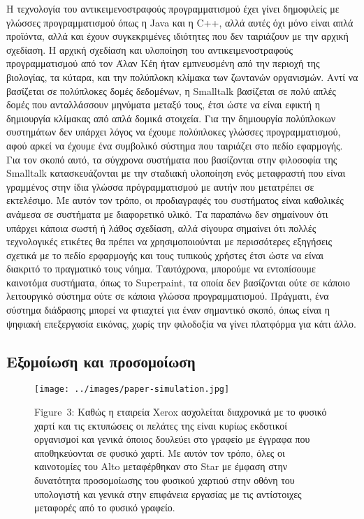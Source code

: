 \documentclass[
]{article}
\begin{document}
Η τεχνολογία του αντικειμενοστραφούς προγραμματισμού έχει γίνει
δημοφιλείς με γλώσσες προγραμματισμού όπως η Java και η C++, αλλά αυτές
όχι μόνο είναι απλά προϊόντα, αλλά και έχουν συγκεκριμένες ιδιότητες που
δεν ταιριάζουν με την αρχική σχεδίαση. Η αρχική σχεδίαση και υλοποίηση
του αντικειμενοστραφούς προγραμματισμού από τον Άλαν Κέη ήταν
εμπνευσμένη από την περιοχή της βιολογίας, τα κύταρα, και την πολύπλοκη
κλίμακα των ζωντανών οργανισμών. Αντί να βασίζεται σε πολύπλοκες δομές
δεδομένων, η Smalltalk βασίζεται σε πολύ απλές δομές που ανταλλάσσουν
μηνύματα μεταξύ τους, έτσι ώστε να είναι εφικτή η δημιουργία κλίμακας
από απλά δομικά στοιχεία. Για την δημιουργία πολύπλοκων συστημάτων δεν
υπάρχει λόγος να έχουμε πολύπλοκες γλώσσες προγραμματισμού, αφού αρκεί
να έχουμε ένα συμβολικό σύστημα που ταιριάζει στο πεδίο εφαρμογής. Για
τον σκοπό αυτό, τα σύγχρονα συστήματα που βασίζονται στην φιλοσοφία της
Smalltalk κατασκευάζονται με την σταδιακή υλοποίηση ενός μεταφραστή που
είναι γραμμένος στην ίδια γλώσσα πρόγραμματισμού με αυτήν που μετατρέπει
σε εκτελέσιμο. Με αυτόν τον τρόπο, οι προδιαγραφές του συστήματος είναι
καθολικές ανάμεσα σε συστήματα με διαφορετικό υλικό. Τα παραπάνω δεν
σημαίνουν ότι υπάρχει κάποια σωστή ή λάθος σχεδίαση, αλλά σίγουρα
σημαίνει ότι πολλές τεχνολογικές ετικέτες θα πρέπει να χρησιμοποιούνται
με περισσότερες εξηγήσεις σχετικά με το πεδίο ερφαρμογής και τους
τυπικούς χρήστες έτσι ώστε να είναι διακριτό το πραγματικό τους νόημα.
Ταυτόχρονα, μπορούμε να εντοπίσουμε καινοτόμα συστήματα, όπως το
Superpaint, τα οποία δεν βασίζονται ούτε σε κάποιο λειτουργικό σύστημα
ούτε σε κάποια γλώσσα προγραμματισμού. Πράγματι, ένα σύστημα διάδρασης
μπορεί να φτιαχτεί για έναν σημαντικό σκοπό, όπως είναι η ψηφιακή
επεξεργασία εικόνας, χωρίς την φιλοδοξία να γίνει πλατφόρμα για κάτι
άλλο.

\hypertarget{ux3b5ux3beux3bfux3bcux3bfux3afux3c9ux3c3ux3b7-ux3baux3b1ux3b9-ux3c0ux3c1ux3bfux3c3ux3bfux3bcux3bfux3afux3c9ux3c3ux3b7}{%
\subsection{Εξομοίωση και
προσομοίωση}\label{ux3b5ux3beux3bfux3bcux3bfux3afux3c9ux3c3ux3b7-ux3baux3b1ux3b9-ux3c0ux3c1ux3bfux3c3ux3bfux3bcux3bfux3afux3c9ux3c3ux3b7}}

\leavevmode{}%
\begin{figure}
\hypertarget{fig:paper-simulation}{%
\centering
\texttt{[image: ../images/paper-simulation.jpg]}
\caption{Figure~3: Καθώς η εταιρεία Xerox ασχολείται διαχρονικά με το
φυσικό χαρτί και τις εκτυπώσεις οι πελάτες της είναι κυρίως εκδοτικοί
οργανισμοί και γενικά όποιος δουλεύει στο γραφείο με έγγραφα που
αποθηκεύονται σε φυσικό χαρτί. Με αυτόν τον τρόπο, όλες οι καινοτομίες
του Alto μεταφέρθηκαν στο Star με έμφαση στην δυνατότητα προσομοίωσης
του φυσικού χαρτιού στην οθόνη του υπολογιστή και γενικά στην επιφάνεια
εργασίας με τις αντίστοιχες μεταφορές από το φυσικό
γραφείο.}\label{fig:paper-simulation}
}
\end{figure}
\end{document}
